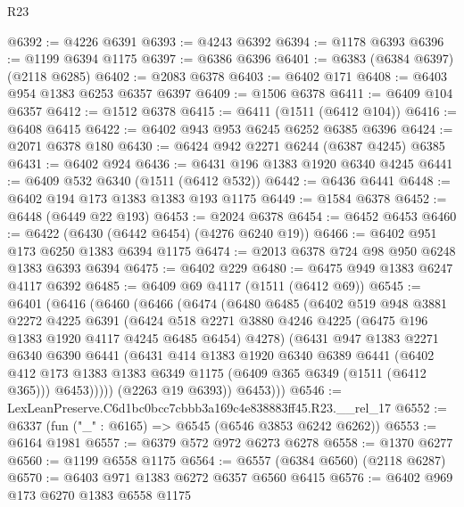 \begin{lexlean}{R23}
\begin{coremodule}
@6392 := @4226 @6391
@6393 := @4243 @6392
@6394 := @1178 @6393
@6396 := @1199 @6394 @1175
@6397 := @6386 @6396
@6401 := @6383 (@6384 @6397) (@2118 @6285)
@6402 := @2083 @6378
@6403 := @6402 @171
@6408 := @6403 @954 @1383 @6253 @6357 @6397
@6409 := @1506 @6378
@6411 := @6409 @104 @6357
@6412 := @1512 @6378
@6415 := @6411 (@1511 (@6412 @104))
@6416 := @6408 @6415
@6422 := @6402 @943 @953 @6245 @6252 @6385 @6396
@6424 := @2071 @6378 @180
@6430 := @6424 @942 @2271 @6244 (@6387 @4245) @6385
@6431 := @6402 @924
@6436 := @6431 @196 @1383 @1920 @6340 @4245
@6441 := @6409 @532 @6340 (@1511 (@6412 @532))
@6442 := @6436 @6441
@6448 := @6402 @194 @173 @1383 @1383 @193 @1175
@6449 := @1584 @6378
@6452 := @6448 (@6449 @22 @193)
@6453 := @2024 @6378
@6454 := @6452 @6453
@6460 := @6422 (@6430 (@6442 @6454) (@4276 @6240 @19))
@6466 := @6402 @951 @173 @6250 @1383 @6394 @1175
@6474 := @2013 @6378 @724 @98 @950 @6248 @1383 @6393 @6394
@6475 := @6402 @229
@6480 := @6475 @949 @1383 @6247 @4117 @6392
@6485 := @6409 @69 @4117 (@1511 (@6412 @69))
@6545 := @6401
    (@6416
      (@6460
        (@6466
          (@6474
            (@6480
              @6485
              (@6402
                @519
                @948
                @3881
                @2272
                @4225
                @6391
                (@6424
                  @518
                  @2271
                  @3880
                  @4246
                  @4225
                  (@6475 @196 @1383 @1920 @4117 @4245 @6485 @6454)
                  @4278)
                (@6431
                  @947
                  @1383
                  @2271
                  @6340
                  @6390
                  @6441
                  (@6431
                    @414
                    @1383
                    @1920
                    @6340
                    @6389
                    @6441
                    (@6402
                      @412
                      @173
                      @1383
                      @1383
                      @6349
                      @1175
                      (@6409 @365 @6349 (@1511 (@6412 @365)))
                      @6453)))))
            (@2263 @19 @6393))
          @6453)))
@6546 := LexLeanPreserve.C6d1bc0bcc7cbbb3a169c4e838883ff45.R23.__rel_17
@6552 := @6337 (fun ("_" : @6165) => @6545 (@6546 @3853 @6242 @6262))
@6553 := @6164 @1981
@6557 := @6379 @572 @972 @6273 @6278
@6558 := @1370 @6277
@6560 := @1199 @6558 @1175
@6564 := @6557 (@6384 @6560) (@2118 @6287)
@6570 := @6403 @971 @1383 @6272 @6357 @6560 @6415
@6576 := @6402 @969 @173 @6270 @1383 @6558 @1175

\end{coremodule}
\end{lexlean}
